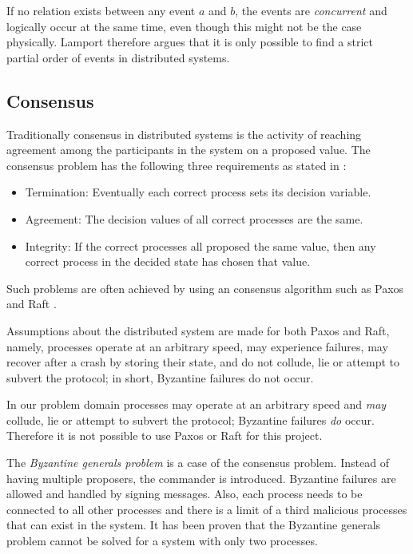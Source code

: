         \noindent If no relation exists between any event $a$ and $b$, the events are \textit{concurrent} and logically occur at the same time, even though this might not be the case physically. Lamport therefore argues that it is only possible to find a strict partial order of events in distributed systems.
		
		\subsection{Consensus}
		Traditionally consensus in distributed systems is the activity of reaching agreement among the participants in the system on a proposed value. The consensus problem has the following three requirements as stated in \cite{Coulouris:2011:DSC:2029110:chapter15}:
		\begin{itemize}
			\item Termination: Eventually each correct process sets its decision variable.
			\item Agreement: The decision values of all correct processes are the same.
			\item Integrity: If the correct processes all proposed the same value, then any correct process in the decided state has chosen that value.
		\end{itemize}
		
		\newpar Such problems are often achieved by using an consensus algorithm such as Paxos\cite{Lamport:1998:PP:279227.279229} and Raft \cite{Raft:Ongaro:184040}.
		
		Assumptions about the distributed system are made for both Paxos and Raft, namely, processes operate at an arbitrary speed, may experience failures, may recover after a crash by storing their state, and do not collude, lie or attempt to subvert the protocol; in short, Byzantine failures do not occur.
		
		In our problem domain processes may operate at an arbitrary speed and \textit{may} collude, lie or attempt to subvert the protocol; Byzantine failures \textit{do} occur. Therefore it is not possible to use Paxos or Raft for this project. 
		 
		\newpar The \textit{Byzantine generals problem} is a case of the consensus problem. Instead of having multiple proposers, the commander is introduced. Byzantine failures are allowed and handled by signing messages. Also, each process needs to be connected to all other processes and there is a limit of a third malicious processes that can exist in the system. It has been proven that the Byzantine generals problem cannot be solved for a system with only two processes. \cite{Lamport:1982:BGP:357172.357176}
        
